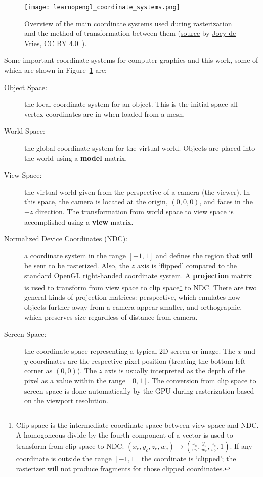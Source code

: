 \begin{figure}[h]
\centering
\texttt{[image: learnopengl\_coordinate\_systems.png]}
\caption{Overview of the main coordinate systems used during rasterization and the method of transformation between them (\href{https://learnopengl.com/img/getting-started/coordinate_systems.png}{source} by \href{https://twitter.com/JoeyDeVriez}{Joey de Vries}, \href{https://creativecommons.org/licenses/by/4.0/}{CC BY 4.0}~\cite{learnopengl}).}
\label{fig:coordinate_systems}
\end{figure}

Some important coordinate systems for computer graphics and this work, some of which are shown in Figure~\ref{fig:coordinate_systems} are:
\begin{description}
    \item[Object Space:] the local coordinate system for an object. This is the initial space all vertex coordinates are in when loaded from a mesh.
    \item[World Space:] the global coordinate system for the virtual world. Objects are placed into the world using a \textbf{model} matrix.
    \item[View Space:] the virtual world given from the perspective of a camera (the viewer). In this space, the camera is located at the origin, $(0,0,0)$, and faces in the $-z$ direction. The transformation from world space to view space is accomplished using a \textbf{view} matrix.
    \item[Normalized Device Coordinates (NDC):] a coordinate system in the range $[-1, 1]$ and defines the region that will be sent to be rasterized. Also, the $z$ axis is `flipped' compared to the standard OpenGL right-handed coordinate system. A \textbf{projection} matrix is used to transform from view space to clip space\footnote{Clip space is the intermediate coordinate space between view space and NDC. A homogoneous divide by the fourth component of a vector is used to transform from clip space to NDC: $(x_c, y_c, z_c, w_c) \rightarrow (\frac{x_c}{w_c}, \frac{y_c}{w_c}, \frac{z_c}{w_c}, 1)$. If any coordinate is outside the range $[-1, 1]$ the coordinate is `clipped'; the rasterizer will not produce fragments for those clipped coordinates. } to NDC. There are two general kinds of projection matrices: perspective, which emulates how objects further away from a camera appear smaller, and orthographic, which preserves size regardless of distance from camera.
    \item[Screen Space:] the coordinate space representing a typical 2D screen or image. The $x$ and $y$ coordinates are the respective pixel position (treating the bottom left corner as $(0,0)$). The $z$ axis is usually interpreted as the depth of the pixel as a value within the range $[0, 1]$. The conversion from clip space to screen space is done automatically by the GPU during rasterization based on the viewport resolution.

\end{description}
